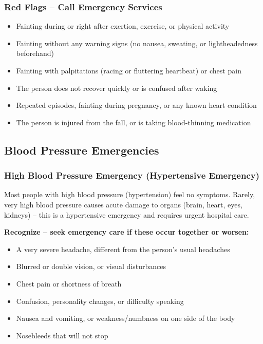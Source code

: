 \subsubsection{Red Flags -- Call Emergency Services}

\begin{itemize}[leftmargin=*]
  \item Fainting during or right after exertion, exercise, or physical activity
  \item Fainting without any warning signs (no nausea, sweating, or lightheadedness beforehand)
  \item Fainting with palpitations (racing or fluttering heartbeat) or chest pain
  \item The person does not recover quickly or is confused after waking
  \item Repeated episodes, fainting during pregnancy, or any known heart condition
  \item The person is injured from the fall, or is taking blood-thinning medication
\end{itemize}


\subsection{Blood Pressure Emergencies}

\subsubsection{High Blood Pressure Emergency (Hypertensive Emergency)}

Most people with high blood pressure (hypertension) feel no symptoms. Rarely, very high blood pressure causes acute damage to organs (brain, heart, eyes, kidneys) -- this is a hypertensive emergency and requires urgent hospital care.

\textbf{Recognize -- seek emergency care if these occur together or worsen:}
\begin{itemize}[leftmargin=*]
  \item A very severe headache, different from the person's usual headaches
  \item Blurred or double vision, or visual disturbances
  \item Chest pain or shortness of breath
  \item Confusion, personality changes, or difficulty speaking
  \item Nausea and vomiting, or weakness/numbness on one side of the body
  \item Nosebleeds that will not stop
\end{itemize}

